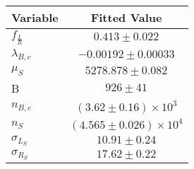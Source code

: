 \begin{tabular}[t]{lc}
\hline
Variable &Fitted Value\\
\hline\hline
$f_{\frac{L}{R}}$&$0.413\pm0.022$\\
\hline
$\lambda_{B,c}$&$-0.00192\pm0.00033$\\
\hline
$\mu_S$&$5278.878\pm0.082$\\
\hline
B&$926\pm41$\\
\hline
$n_{B,c}$&$(3.62\pm0.16)\times 10^3$\\
\hline
$n_S$&$(4.565\pm0.026)\times 10^4$\\
\hline
$\sigma_{L_S}$&$10.91\pm0.24$\\
\hline
$\sigma_{R_S}$&$17.62\pm0.22$\\
\hline
\end{tabular}